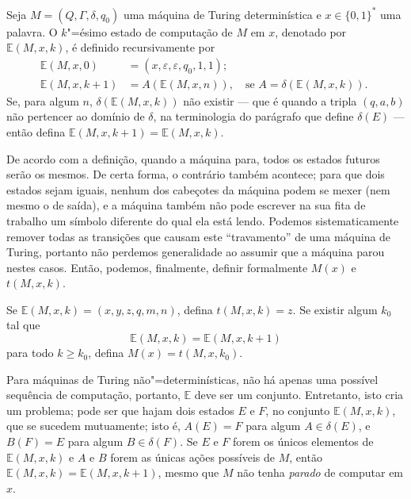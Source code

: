 \begin{definition}
    Seja $M = (Q, \Gamma, \delta, q_0)$ uma máquina de Turing determinística
    e $x \in \{0, 1\}^*$ uma palavra.
    O $k$"=ésimo estado de computação de $M$ em $x$,
    denotado por $\mathbb E(M, x, k)$,
    é definido recursivamente por
    \begin{align*}
        \mathbb E(M, x, 0) &= (x, \varepsilon, \varepsilon, q_0, 1, 1); \\
        \mathbb E(M, x, k+1) &= A(\mathbb E(M, x, n)), \quad \text{
            se $A = \delta(\mathbb E(M, x, k))$.
        }
    \end{align*}
    Se, para algum $n$, $\delta(\mathbb E(M, x, k))$ não existir
    --- que é quando a tripla $(q, a, b)$ não pertencer ao domínio de $\delta$,
    na terminologia do parágrafo que define $\delta(E)$ ---
    então defina $\mathbb E(M, x, k+1) = \mathbb E(M, x, k)$.
\end{definition}
De acordo com a definição, quando a máquina para,
todos os estados futuros serão os mesmos.
De certa forma,
o contrário também acontece;
para que dois estados sejam iguais,
nenhum dos cabeçotes da máquina podem se mexer
(nem mesmo o de saída),
e a máquina também não pode escrever na sua fita de trabalho
um símbolo diferente do qual ela está lendo.
Podemos sistematicamente remover todas as transições que causam este ``travamento''
de uma máquina de Turing,
portanto não perdemos generalidade ao assumir que a máquina parou nestes casos.
Então,
podemos, finalmente,
definir formalmente $M(x)$ e $t(M, x, k)$.
\begin{definition}
    Se $\mathbb E(M, x, k) = (x, y, z, q, m, n)$,
    defina $t(M, x, k) = z$.
    Se existir algum $k_0$ tal que
    \begin{equation*}
        \mathbb E(M, x, k) = \mathbb E(M, x, k+1)
    \end{equation*}
    para todo $k \geq k_0$,
    defina $M(x) = t(M, x, k_0)$.
\end{definition}

Para máquinas de Turing não"=determinísticas,
não há apenas uma possível sequência de computação,
portanto, $\mathbb E$ deve ser um conjunto.
Entretanto,
isto cria um problema;
pode ser que hajam dois estados $E$ e $F$, no conjunto $\mathbb E(M, x, k)$,
que se sucedem mutuamente;
isto é, $A(E) = F$ para algum $A \in \delta(E)$,
e $B(F) = E$ para algum $B \in \delta(F)$.
Se $E$ e $F$ forem os únicos elementos de $\mathbb E(M, x, k)$
e $A$ e $B$ forem as únicas ações possíveis de $M$,
então $\mathbb E(M, x, k) = \mathbb E(M, x, k+1)$,
mesmo que $M$ não tenha \emph{parado} de computar em $x$.

